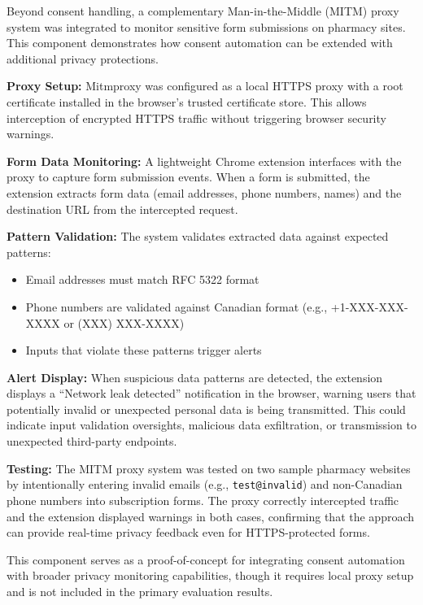 \documentclass[conference]{IEEEtran}
\begin{document}
Beyond consent handling, a complementary Man-in-the-Middle (MITM) proxy system was integrated to monitor sensitive form submissions on pharmacy sites. This component demonstrates how consent automation can be extended with additional privacy protections.

\textbf{Proxy Setup:} Mitmproxy was configured as a local HTTPS proxy with a root certificate installed in the browser's trusted certificate store. This allows interception of encrypted HTTPS traffic without triggering browser security warnings.

\textbf{Form Data Monitoring:} A lightweight Chrome extension interfaces with the proxy to capture form submission events. When a form is submitted, the extension extracts form data (email addresses, phone numbers, names) and the destination URL from the intercepted request.

\textbf{Pattern Validation:} The system validates extracted data against expected patterns:

\begin{itemize}

    \item Email addresses must match RFC 5322 format

    \item Phone numbers are validated against Canadian format (e.g., +1-XXX-XXX-XXXX or (XXX) XXX-XXXX)

    \item Inputs that violate these patterns trigger alerts

\end{itemize}

\textbf{Alert Display:} When suspicious data patterns are detected, the extension displays a ``Network leak detected'' notification in the browser, warning users that potentially invalid or unexpected personal data is being transmitted. This could indicate input validation oversights, malicious data exfiltration, or transmission to unexpected third-party endpoints.

\textbf{Testing:} The MITM proxy system was tested on two sample pharmacy websites by intentionally entering invalid emails (e.g., \texttt{test@invalid}) and non-Canadian phone numbers into subscription forms. The proxy correctly intercepted traffic and the extension displayed warnings in both cases, confirming that the approach can provide real-time privacy feedback even for HTTPS-protected forms.

This component serves as a proof-of-concept for integrating consent automation with broader privacy monitoring capabilities, though it requires local proxy setup and is not included in the primary evaluation results.
\end{document}
